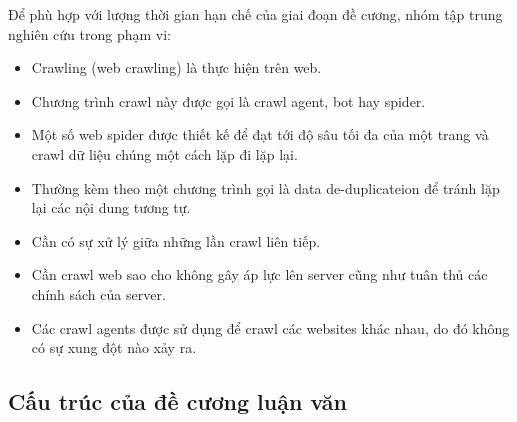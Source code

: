 Để phù hợp với lượng thời gian  hạn chế của giai đoạn đề cương, nhóm tập trung nghiên cứu trong phạm vi:
\begin{itemize}
    \item Crawling (web crawling) là thực hiện trên web.
    \item Chương trình crawl này được gọi là crawl agent, bot hay  spider.
    \item Một số web spider được thiết kế để đạt tới độ sâu tối đa của một trang và crawl dữ liệu chúng một cách lặp đi lặp lại.
    \item Thường kèm theo một chương trình gọi là data de-duplicateion để tránh lặp lại các nội dung tương tự.
    \item Cần có sự xử lý giữa những lần crawl liên tiếp.
    \item Cần crawl web sao cho không gây áp lực lên server cũng như tuân thủ các chính sách của server.
    \item Các crawl agents được sử dụng để crawl các websites khác nhau, do đó không có sự xung đột nào xảy ra.
\end{itemize}

\subsection{Cấu trúc của đề cương luận văn}

